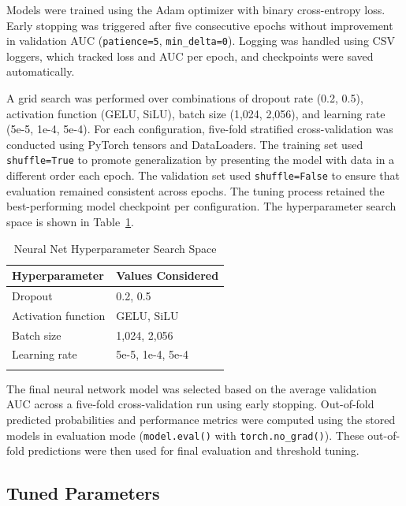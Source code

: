 \documentclass{article}
\begin{document}
Models were trained using the Adam optimizer with binary cross-entropy loss. Early stopping was triggered after five consecutive epochs without improvement in validation AUC (\texttt{patience=5}, \texttt{min\_delta=0}). Logging was handled using CSV loggers, which tracked loss and AUC per epoch, and checkpoints were saved automatically.

A grid search was performed over combinations of dropout rate (0.2, 0.5), activation function (GELU, SiLU), batch size (1{,}024, 2{,}056), and learning rate (5e-5, 1e-4, 5e-4). For each configuration, five-fold stratified cross-validation was conducted using PyTorch tensors and DataLoaders. The training set used \texttt{shuffle=True} to promote generalization by presenting the model with data in a different order each epoch. The validation set used \texttt{shuffle=False} to ensure that evaluation remained consistent across epochs. The tuning process retained the best-performing model checkpoint per configuration. The hyperparameter search space is shown in Table~\ref{table:nn_params}.

\begin{table}[!htbp]
    \centering
    \caption{Neural Net Hyperparameter Search Space}
    \begin{tabular}{ll}
    \arrayrulecolor{black}
    \toprule
    \textbf{Hyperparameter} & \textbf{Values Considered} \\
    \midrule
    \arrayrulecolor{lightgray}
    Dropout & 0.2, 0.5 \\
    \hline
    Activation function & GELU, SiLU \\
    \hline
    Batch size & 1{,}024, 2{,}056 \\
    \hline
    Learning rate & 5e-5, 1e-4, 5e-4 \\
    \arrayrulecolor{black}
    \bottomrule
    \end{tabular}
    \label{table:nn_params}
\end{table}

The final neural network model was selected based on the average validation AUC across a five-fold cross-validation run using early stopping. Out-of-fold predicted probabilities and performance metrics were computed using the stored models in evaluation mode (\texttt{model.eval()} with \texttt{torch.no\_grad()}). These out-of-fold predictions were then used for final evaluation and threshold tuning.

\subsection{Tuned Parameters}
\end{document}
